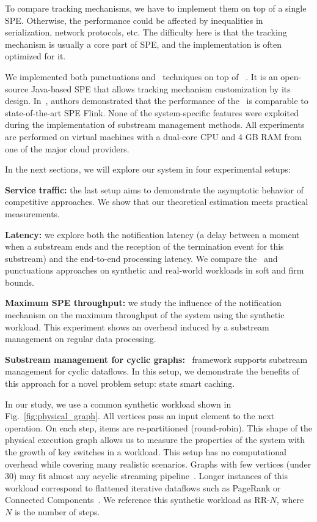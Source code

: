 To compare tracking mechanisms, we have to implement them on top of a single SPE. Otherwise, the performance could be affected by inequalities in serialization, network protocols, etc.  The difficulty here is that the tracking mechanism is usually a core part of SPE, and the implementation is often optimized for it. 

We implemented both punctuations and \tracker\ techniques on top of \FlameStream~\cite{we2018beyondmr}. It is an open-source Java-based SPE that allows tracking mechanism customization by its design. In~\cite{we2018adbis}, authors demonstrated that the performance of the \FlameStream\ is comparable to state-of-the-art SPE Flink. None of the system-specific features were exploited during the implementation of substream management methods. All experiments are performed on virtual machines with a dual-core CPU and 4 GB RAM from one of the major cloud providers. 

In the next sections, we will explore our system in four experimental setups:
    
    \noindent \textbf{Service traffic:} the last setup aims to demonstrate the asymptotic behavior of competitive approaches. We show that our theoretical estimation meets practical measurements.
    
    \noindent \textbf{Latency:} we explore both the notification latency (a delay between a moment when a substream ends and the reception of the termination event for this substream) and the end-to-end processing latency. We compare the \tracker\ and punctuations approaches on synthetic and real-world workloads in soft and firm bounds.
    
    \noindent \textbf{Maximum SPE throughput:} we study the influence of the notification mechanism on the maximum throughput of the system using the synthetic workload. This experiment shows an overhead induced by a substream management  on regular data processing.
    
    \noindent \textbf{Substream management for cyclic graphs:} \tracker\ framework supports substream management for cyclic dataflows. In this setup, we demonstrate the benefits of this approach for a novel problem setup: state smart caching.


In our study, we use a common synthetic workload shown in Fig.~\ref{fig:physical_graph}. All vertices pass an input element to the next operation. On each step, items are re-partitioned (round-robin). This shape of the physical execution graph allows us to measure the properties of the system with the growth of key switches in a workload. This setup has no computational overhead while covering many realistic scenarios. Graphs with few vertices (under 30) may fit almost any acyclic streaming pipeline~\cite{akidau2018streaming}. Longer instances of this workload correspond to flattened iterative dataflows such as PageRank or Connected Components~\cite{Murray:2013:NTD:2517349.2522738, xu2016efficient}. We reference this synthetic workload as RR-$N$, where $N$ is the number of steps.

